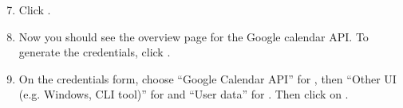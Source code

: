 \documentclass[letterpaper,10pt,english]{sphinxmanual}
\begin{document}
\begin{DUlineblock}{0em}
\item[] 
\end{DUlineblock}
\begin{enumerate}
\setcounter{enumi}{6}
\item {} 
Click .

\end{enumerate}

\begin{figure}[htbp]
\centering
{}\end{figure}

\begin{DUlineblock}{0em}
\item[] 
\end{DUlineblock}
\begin{enumerate}
\setcounter{enumi}{7}
\item {} 
Now you should see the overview page for the Google calendar API.
To generate the credentials, click .

\end{enumerate}

\begin{figure}[htbp]
\centering
{}\end{figure}

\begin{DUlineblock}{0em}
\item[] 
\end{DUlineblock}
\begin{enumerate}
\setcounter{enumi}{8}
\item {} 
On the credentials form, choose “Google Calendar API” for ,
then “Other UI (e.g. Windows, CLI tool)” for 
and “User data” for . Then click on .

\end{enumerate}

\begin{figure}[htbp]
\centering
{}\end{figure}
\end{document}
